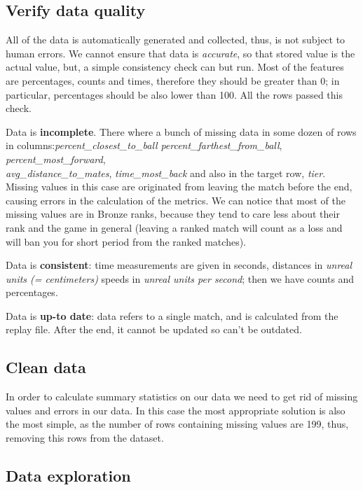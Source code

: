 

\subsection{Verify data quality}

All of the data is automatically generated and collected, thus, is not subject to human errors.
We cannot ensure that data is \textit{accurate}, so that stored value is the actual value, but, a simple consistency check can but run.
Most of the features are percentages, counts and times, therefore they should be greater than 0; in particular, percentages should be also lower than 100. All the rows passed this check.

Data is \textbf{incomplete}. There where a bunch of missing data in some dozen of rows in columns:\textit{percent\_closest\_to\_ball} \textit{percent\_farthest\_from\_ball}, \textit{percent\_most\_forward}, \\ \textit{avg\_distance\_to\_mates}, \textit{time\_most\_back} and also in the target row, \textit{tier}. \\
Missing values in this case are originated from leaving the match before the end, causing errors in the calculation of the metrics. We can notice that most of the missing values are in Bronze ranks, because they tend to care less about their rank and the game in general (leaving a ranked match will count as a loss and will ban you for short period from the ranked matches).

Data is \textbf{consistent}: time measurements are given in seconds, distances in \textit{unreal units (= centimeters)} speeds in \textit{unreal units per second}; then we have counts and percentages.

Data is \textbf{up-to date}: data refers to a single match, and is calculated from the replay file. After the end, it cannot be updated so can't be outdated.

\subsection{Clean data}

In order to calculate summary statistics on our data we need to get rid of missing values and errors in our data.
In this case the most appropriate solution is also the most simple, as the number of rows containing missing values are 199, thus, removing this rows from the dataset.

\subsection{Data exploration}

